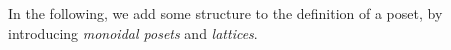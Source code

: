 

\chapter{}\label{ch:parallelism}
In the following, we add some structure to the definition of a poset, by introducing \emph{monoidal posets} and \emph{lattices}.







